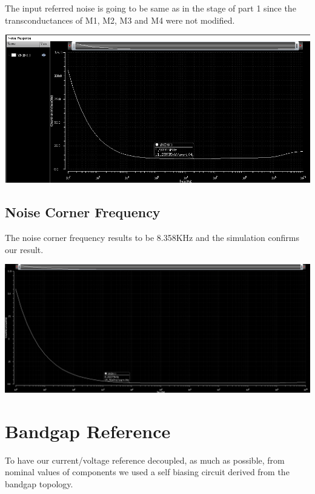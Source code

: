 The input referred noise is going to be same as in the stage of part 1 since the transconductances of M1, M2, M3 and M4 were not modified.

\centering
\includegraphics[width=1\textwidth]{Capitoli/wn.png}
\raggedright


\subsection{Noise Corner Frequency} %
\label{sub:noise_corner_frequency}

The noise corner frequency results to be 8.358KHz and the simulation confirms our result.




\centering
\includegraphics[width=1\textwidth]{Capitoli/ncf.png}
\raggedright

\vfill
\section{Bandgap Reference}


To have our current/voltage reference decoupled, as much as possible, from nominal values of components we used a self biasing circuit derived from the bandgap topology.


